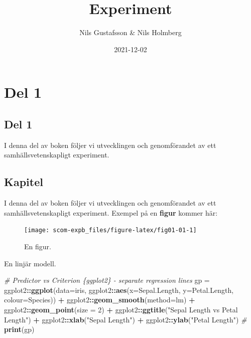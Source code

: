 \documentclass[
]{book}
\title{Experiment}
\author{Nils Gustafsson \& Nils Holmberg}
\date{2021-12-02}
\newenvironment{Shaded}{\begin{snugshade}}{\end{snugshade}}
\newcommand{\CommentTok}[1]{\textcolor[rgb]{0.56,0.35,0.01}{\textit{#1}}}
\newcommand{\DataTypeTok}[1]{\textcolor[rgb]{0.13,0.29,0.53}{#1}}
\newcommand{\DecValTok}[1]{\textcolor[rgb]{0.00,0.00,0.81}{#1}}
\newcommand{\KeywordTok}[1]{\textcolor[rgb]{0.13,0.29,0.53}{\textbf{#1}}}
\newcommand{\NormalTok}[1]{#1}
\newcommand{\OperatorTok}[1]{\textcolor[rgb]{0.81,0.36,0.00}{\textbf{#1}}}
\newcommand{\StringTok}[1]{\textcolor[rgb]{0.31,0.60,0.02}{#1}}
\begin{document}
\maketitle

{
\setcounter{tocdepth}{1}
\tableofcontents
}
\hypertarget{part-del-1}{%
\part{Del 1}\label{part-del-1}}

\hypertarget{del-1}{%
\chapter*{Del 1}\label{del-1}}

I denna del av boken följer vi utvecklingen och genomförandet av ett samhällsvetenskapligt experiment.

\hypertarget{chap01}{%
\chapter{Kapitel}\label{chap01}}

I denna del av boken följer vi utvecklingen och genomförandet av ett samhällsvetenskapligt experiment. Exempel på en \textbf{figur} kommer här:

\begin{figure}

{\centering \texttt{[image: scom-expb\_files/figure-latex/fig01-01-1]} 

}

\caption{En figur.}\label{fig:fig01-01}
\end{figure}

En linjär modell.

\begin{Shaded}
\begin{Highlighting}[]
\CommentTok{\# Predictor vs Criterion \{ggplot2\} {-} separate regression lines}
\NormalTok{gp =}\StringTok{ }\NormalTok{ggplot2}\OperatorTok{::}\KeywordTok{ggplot}\NormalTok{(}\DataTypeTok{data=}\NormalTok{iris, }
\NormalTok{ggplot2}\OperatorTok{::}\KeywordTok{aes}\NormalTok{(}\DataTypeTok{x=}\NormalTok{Sepal.Length,}
\DataTypeTok{y=}\NormalTok{Petal.Length,}
\DataTypeTok{colour=}\NormalTok{Species)) }\OperatorTok{+}\StringTok{ }
\NormalTok{ggplot2}\OperatorTok{::}\KeywordTok{geom\_smooth}\NormalTok{(}\DataTypeTok{method=}\NormalTok{lm) }\OperatorTok{+}\StringTok{ }
\NormalTok{ggplot2}\OperatorTok{::}\KeywordTok{geom\_point}\NormalTok{(}\DataTypeTok{size =} \DecValTok{2}\NormalTok{) }\OperatorTok{+}
\NormalTok{ggplot2}\OperatorTok{::}\KeywordTok{ggtitle}\NormalTok{(}\StringTok{"Sepal Length vs Petal Length"}\NormalTok{) }\OperatorTok{+}
\NormalTok{ggplot2}\OperatorTok{::}\KeywordTok{xlab}\NormalTok{(}\StringTok{"Sepal Length"}\NormalTok{) }\OperatorTok{+}\StringTok{ }\NormalTok{ggplot2}\OperatorTok{::}\KeywordTok{ylab}\NormalTok{(}\StringTok{"Petal Length"}\NormalTok{)}
\CommentTok{\#}
\KeywordTok{print}\NormalTok{(gp)}
\end{Highlighting}
\end{Shaded}
\end{document}
